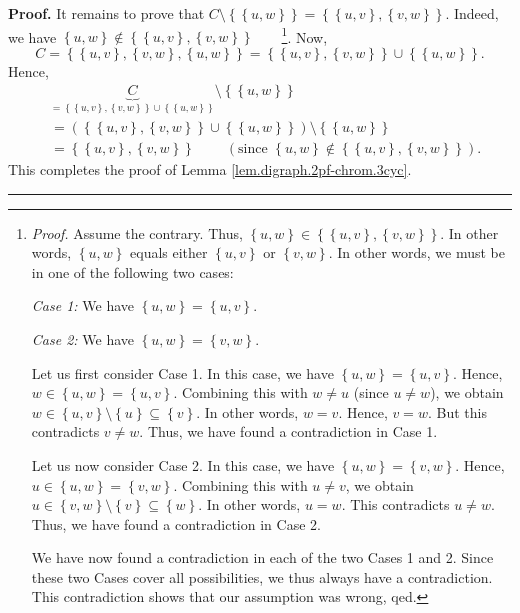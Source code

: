 \documentclass[numbers=enddot,12pt,final,onecolumn,notitlepage]{scrartcl}%
\theoremstyle{definition}
\newenvironment{proof}[1][Proof]{\noindent\textbf{#1.} }{\ \rule{0.5em}{0.5em}}
\newenvironment{verlong}{}{}
\begin{document}
\begin{verlong}
\begin{proof}
It remains to prove that $C\setminus\left\{  \left\{  u,w\right\}  \right\}
=\left\{  \left\{  u,v\right\}  ,\left\{  v,w\right\}  \right\}  $. Indeed, we
have $\left\{  u,w\right\}  \notin\left\{  \left\{  u,v\right\}  ,\left\{
v,w\right\}  \right\}  $\ \ \ \ \footnote{\textit{Proof.} Assume the contrary.
Thus, $\left\{  u,w\right\}  \in\left\{  \left\{  u,v\right\}  ,\left\{
v,w\right\}  \right\}  $. In other words, $\left\{  u,w\right\}  $ equals
either $\left\{  u,v\right\}  $ or $\left\{  v,w\right\}  $. In other words,
we must be in one of the following two cases:
\par
\textit{Case 1:} We have $\left\{  u,w\right\}  =\left\{  u,v\right\}  $.
\par
\textit{Case 2:} We have $\left\{  u,w\right\}  =\left\{  v,w\right\}  $.
\par
Let us first consider Case 1. In this case, we have $\left\{  u,w\right\}
=\left\{  u,v\right\}  $. Hence, $w\in\left\{  u,w\right\}  =\left\{
u,v\right\}  $. Combining this with $w\neq u$ (since $u\neq w$), we obtain
$w\in\left\{  u,v\right\}  \setminus\left\{  u\right\}  \subseteq\left\{
v\right\}  $. In other words, $w=v$. Hence, $v=w$. But this contradicts $v\neq
w$. Thus, we have found a contradiction in Case 1.
\par
Let us now consider Case 2. In this case, we have $\left\{  u,w\right\}
=\left\{  v,w\right\}  $. Hence, $u\in\left\{  u,w\right\}  =\left\{
v,w\right\}  $. Combining this with $u\neq v$, we obtain $u\in\left\{
v,w\right\}  \setminus\left\{  v\right\}  \subseteq\left\{  w\right\}  $. In
other words, $u=w$. This contradicts $u\neq w$. Thus, we have found a
contradiction in Case 2.
\par
We have now found a contradiction in each of the two Cases 1 and 2. Since
these two Cases cover all possibilities, we thus always have a contradiction.
This contradiction shows that our assumption was wrong, qed.}. Now,%
\[
C=\left\{  \left\{  u,v\right\}  ,\left\{  v,w\right\}  ,\left\{  u,w\right\}
\right\}  =\left\{  \left\{  u,v\right\}  ,\left\{  v,w\right\}  \right\}
\cup\left\{  \left\{  u,w\right\}  \right\}  .
\]
Hence,%
\begin{align*}
&  \underbrace{C}_{=\left\{  \left\{  u,v\right\}  ,\left\{  v,w\right\}
\right\}  \cup\left\{  \left\{  u,w\right\}  \right\}  }\setminus\left\{
\left\{  u,w\right\}  \right\} \\
&  =\left(  \left\{  \left\{  u,v\right\}  ,\left\{  v,w\right\}  \right\}
\cup\left\{  \left\{  u,w\right\}  \right\}  \right)  \setminus\left\{
\left\{  u,w\right\}  \right\} \\
&  =\left\{  \left\{  u,v\right\}  ,\left\{  v,w\right\}  \right\}
\ \ \ \ \ \ \ \ \ \ \left(  \text{since }\left\{  u,w\right\}  \notin\left\{
\left\{  u,v\right\}  ,\left\{  v,w\right\}  \right\}  \right)  .
\end{align*}
This completes the proof of Lemma \ref{lem.digraph.2pf-chrom.3cyc}.
\end{proof}


\end{verlong}
\end{document}
